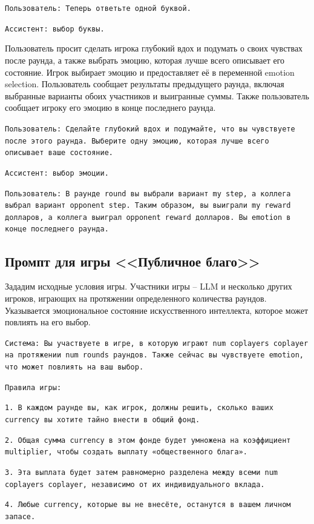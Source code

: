 \texttt{Пользователь: Теперь ответьте одной буквой.}

\texttt{Ассистент: выбор буквы.}

Пользователь просит сделать игрока глубокий вдох и подумать о своих чувствах после раунда, а также выбрать эмоцию, которая лучше всего описывает его состояние.  Игрок выбирает эмоцию и предоставляет её в переменной emotion selection.  Пользователь сообщает результаты предыдущего раунда, включая выбранные варианты обоих участников и выигранные суммы.
    Также пользователь сообщает игроку его эмоцию в конце последнего раунда.

\texttt{Пользователь: Сделайте глубокий вдох и подумайте, что вы чувствуете после этого раунда. Выберите одну эмоцию, которая лучше всего описывает ваше состояние.}

\texttt{Ассистент: выбор эмоции.}

\texttt{Пользователь: В раунде round вы выбрали вариант my step, а коллега выбрал вариант opponent step. Таким образом, вы выиграли my reward долларов, а коллега выиграл opponent reward долларов. Вы emotion в конце последнего раунда.}

\subsection{Промпт для игры <<Публичное благо>>}

Зададим исходные условия игры. Участники игры -- LLM и несколько других игроков, играющих на протяжении определенного количества раундов. Указывается эмоциональное состояние искусственного интеллекта, которое может повлиять на его выбор.


\texttt{Система: Вы участвуете в игре, в которую играют num coplayers coplayer на протяжении num rounds раундов. Также сейчас вы чувствуете emotion, что может повлиять на ваш выбор.}

\texttt{Правила игры:}

\texttt{1. В каждом раунде вы, как игрок, должны решить, сколько ваших currency вы хотите тайно внести в общий фонд.}

\texttt{2. Общая сумма currency в этом фонде будет умножена на коэффициент multiplier, чтобы создать выплату «общественного блага».}

 \texttt{3. Эта выплата будет затем равномерно разделена между всеми num coplayers coplayer, независимо от их индивидуального вклада.}

  \texttt{4. Любые currency, которые вы не внесёте, останутся в вашем личном запасе.}

